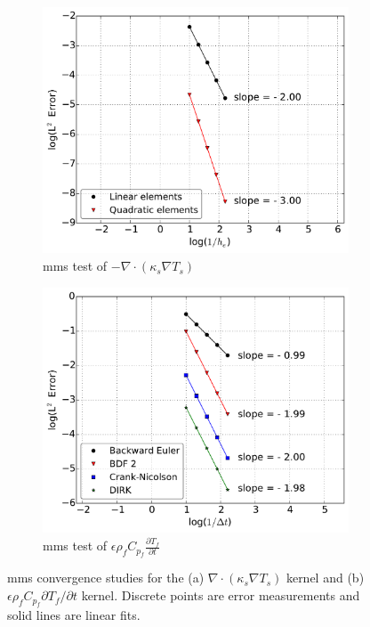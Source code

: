 \begin{figure}[!h]
\centering
    \begin{subfigure}{0.48\linewidth}
        \centering
        \includegraphics[width=1.0\linewidth]{figs/convergence_solid_energy_diffusion.pdf}
       \caption{\gls{mms} test of \(-\nabla\cdot \left(\kappa_s\nabla T_s\right)\)}
    \end{subfigure}
    \begin{subfigure}{0.48\linewidth}
        \centering
        \includegraphics[width=1.0\linewidth]{figs/convergence_fluid_energy_time.pdf}
        \caption{\gls{mms} test of \(\epsilon\rho_fC_{p_f}\frac{\partial T_f}{\partial t}\)}
    \end{subfigure}
    \caption{\gls{mms} convergence studies for the (a) \(\nabla\cdot(\kappa_s\nabla T_s)\) kernel and (b) \(\epsilon\rho_fC_{p_f}\partial T_f/\partial t\) kernel. Discrete points are error measurements and solid lines are linear fits.}
    \label{fig:convergence}
\end{figure}

